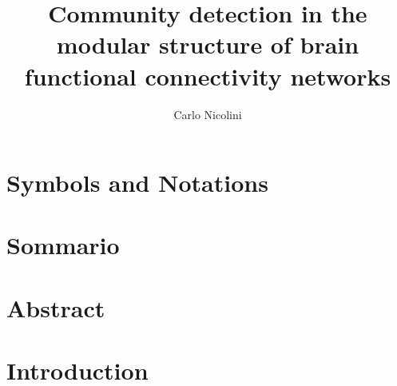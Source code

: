 
%

\title{Community detection in the modular structure of brain functional connectivity networks}
\author{Carlo Nicolini}


\newtheorem{obs}{Observation}
\newtheorem{props}{Proposition}
\newenvironment{bottompar}{\par\vspace*{\fill}}{\clearpage}




{}

\tableofcontents
\listoftodos

%

\chapter*{Symbols and Notations}


% 
\chapter*{Sommario}



\chapter*{Abstract}


\chapter{Introduction}\label{chap:introduction}


